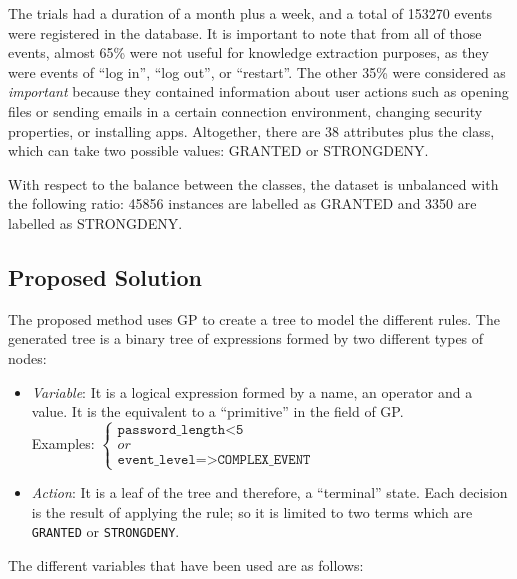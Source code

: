 \documentclass[a4paper,10pt,twocolumn,preprint,3p]{elsarticle}
\begin{document}
The trials had a duration of a month plus a week, and a total of 153270 events were registered in the database. It is important to note that from all of those events, almost 65\% were not useful for knowledge extraction purposes, as they were events of ``log in'', ``log out'', or ``restart''. The other 35\% were considered as \textit{important} because they contained information about user actions such as opening files or sending emails in a certain connection environment, changing security properties, or installing apps. Altogether, there are 38 attributes plus the class, which can take two possible values: GRANTED or STRONGDENY.

With respect to the balance between the classes, the dataset is unbalanced with the following ratio: 45856 instances are labelled as GRANTED and 3350 are labelled as STRONGDENY.

\subsection{Proposed Solution}
\label{subsec:solution}
The proposed method uses GP to create a tree to model the different rules. The generated tree
is a binary tree of expressions formed by two different types of nodes:

\begin{itemize}
\item {\em Variable}: It is a logical expression formed by a name, an operator and a value. It is the equivalent to a ``primitive'' in the field of GP. \\
    Examples:
   \begin{math}
     \left \{
   \begin{array}{l}
     \texttt{password\_length<5} \\
     or \\
      \texttt{event\_level=>COMPLEX\_EVENT}
   \end{array}
   \right .
   \end{math}
\item {\em Action}: It is a leaf of the   tree and therefore, a ``terminal'' state. Each decision is the result of applying the rule; so it is limited to two terms which are \texttt{GRANTED} or \texttt{STRONGDENY}.
\end{itemize}

The different variables that have been used are as follows:
\end{document}
